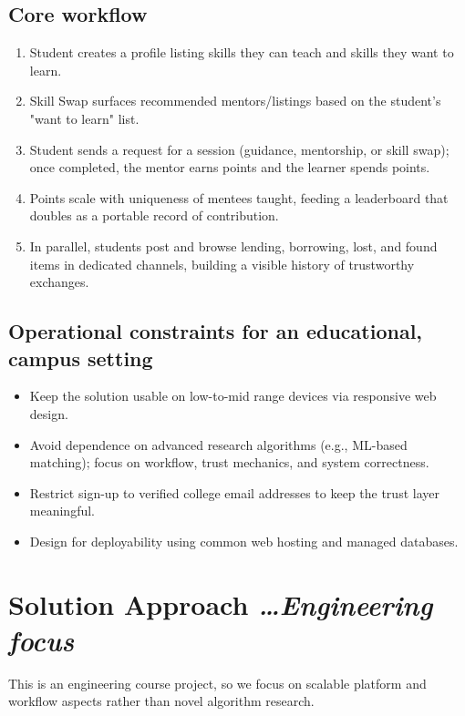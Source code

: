 \documentclass[11pt,a4paper]{article}
\newcommand{\BvrHint}[1]{%
  {\normalfont\normalsize\itshape\hfill #1}}
\begin{document}
\subsection{Core workflow}
\begin{enumerate}[leftmargin=0.7cm]
    \item Student creates a profile listing skills they can teach and skills they want to learn.
    \item Skill Swap surfaces recommended mentors/listings based on the student's "want to learn" list.
    \item Student sends a request for a session (guidance, mentorship, or skill swap); once completed, the mentor earns points and the learner spends points.
    \item Points scale with uniqueness of mentees taught, feeding a leaderboard that doubles as a portable record of contribution.
    \item In parallel, students post and browse lending, borrowing, lost, and found items in dedicated channels, building a visible history of trustworthy exchanges.
\end{enumerate}

\subsection{Operational constraints for an educational, campus setting}
\begin{itemize}[leftmargin=0.7cm]
    \item Keep the solution usable on low-to-mid range devices via responsive web design.
    \item Avoid dependence on advanced research algorithms (e.g., ML-based matching); focus on workflow, trust mechanics, and system correctness.
    \item Restrict sign-up to verified college email addresses to keep the trust layer meaningful.
    \item Design for deployability using common web hosting and managed databases.
\end{itemize}

\section{Solution Approach %
\BvrHint{\ldots Engineering focus}}
This is an engineering course project, so we focus on scalable platform and workflow aspects rather than novel algorithm research.
\end{document}

